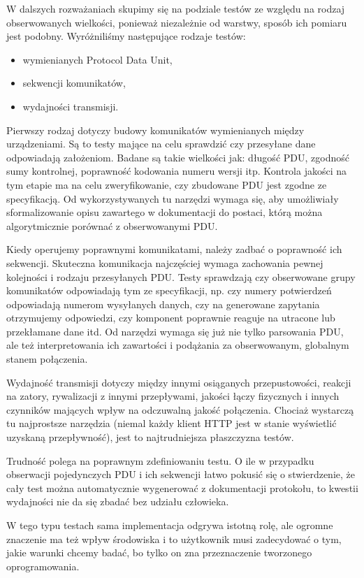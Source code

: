 \documentclass[00-praca-magisterska.tex]{subfiles}
\begin{document}
W dalszych rozważaniach skupimy się na podziale testów ze względu na rodzaj
obserwowanych wielkości, ponieważ niezależnie od warstwy, sposób ich pomiaru
jest podobny. Wyróżniliśmy następujące rodzaje testów:
\begin{itemize}
  \item{wymienianych Protocol Data Unit,}
  \item{sekwencji komunikatów,}
  \item{wydajności transmisji.}
\end{itemize}

Pierwszy rodzaj dotyczy budowy komunikatów wymienianych między urządzeniami. Są
to testy mające na celu sprawdzić czy przesyłane dane odpowiadają założeniom.
Badane są takie wielkości jak: długość PDU, zgodność sumy kontrolnej,
poprawność kodowania numeru wersji itp. Kontrola jakości na tym etapie ma na
celu zweryfikowanie, czy zbudowane PDU jest zgodne ze specyfikacją. Od
wykorzystywanych tu narzędzi wymaga się, aby umożliwiały sformalizowanie opisu
zawartego w dokumentacji do postaci, którą można algorytmicznie porównać z
obserwowanymi PDU.

Kiedy operujemy poprawnymi komunikatami, należy zadbać o poprawność ich
sekwencji. Skuteczna komunikacja najczęściej wymaga zachowania pewnej
kolejności i rodzaju przesyłanych PDU. Testy sprawdzają czy obserwowane grupy
komunikatów odpowiadają tym ze specyfikacji, np. czy numery potwierdzeń
odpowiadają numerom wysyłanych danych, czy na generowane zapytania otrzymujemy
odpowiedzi, czy komponent poprawnie reaguje na utracone lub przekłamane dane
itd. Od narzędzi wymaga się już nie tylko parsowania PDU, ale też
interpretowania ich zawartości i podążania za obserwowanym, globalnym stanem
połączenia.

Wydajność transmisji dotyczy między innymi osiąganych przepustowości, reakcji
na zatory, rywalizacji z innymi przepływami, jakości łączy fizycznych i innych
czynników mających wpływ na odczuwalną jakość połączenia. Chociaż wystarczą tu
najprostsze narzędzia (niemal każdy klient HTTP jest w stanie wyświetlić
uzyskaną przepływność), jest to najtrudniejsza płaszczyzna testów.

Trudność polega na poprawnym zdefiniowaniu testu. O ile w przypadku obserwacji
pojedynczych PDU i ich sekwencji łatwo pokusić się o stwierdzenie, że cały test
można automatycznie wygenerować z dokumentacji protokołu, to kwestii wydajności
nie da się zbadać bez udziału człowieka.

W tego typu testach sama implementacja odgrywa istotną rolę, ale ogromne
znaczenie ma też wpływ środowiska i to użytkownik musi zadecydować o tym, jakie
warunki chcemy badać, bo tylko on zna przeznaczenie tworzonego oprogramowania.
\end{document}
